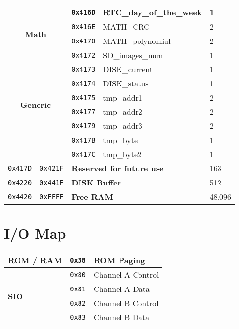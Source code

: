 \documentclass[a4paper,11pt]{article}
\begin{document}
\begin{longtable}{ |l|l|l|l|l| }
        \multicolumn{2}{|c|}{} & \texttt{0x416D} & RTC\_day\_of\_the\_week & 1\\
        \hline
        \multicolumn{2}{|c|}{\multirow{2}{*}{\textbf{Math}}} & \texttt{0x416E} & MATH\_CRC & 2\\
        \multicolumn{2}{|c|}{} & \texttt{0x4170} & MATH\_polynomial & 2\\
        \hline
        \multicolumn{2}{|c|}{\multirow{8}{*}{\textbf{Generic}}} & \texttt{0x4172} & SD\_images\_num & 1\\
        \multicolumn{2}{|c|}{} & \texttt{0x4173} & DISK\_current & 1\\
        \multicolumn{2}{|c|}{} & \texttt{0x4174} & DISK\_status & 1\\
        \multicolumn{2}{|c|}{} & \texttt{0x4175} & tmp\_addr1 & 2\\
        \multicolumn{2}{|c|}{} & \texttt{0x4177} & tmp\_addr2 & 2\\
        \multicolumn{2}{|c|}{} & \texttt{0x4179} & tmp\_addr3 & 2\\
        \multicolumn{2}{|c|}{} & \texttt{0x417B} & tmp\_byte & 1\\
        \multicolumn{2}{|c|}{} & \texttt{0x417C} & tmp\_byte2 & 1\\
        \hline
        \texttt{0x417D} & \texttt{0x421F} & \multicolumn{2}{|l|}{\textbf{Reserved for future use}} & 163\\
        \hline
        \texttt{0x4220} & \texttt{0x441F} & \multicolumn{2}{|l|}{\textbf{DISK Buffer}} & 512\\
        \hline
        \texttt{0x4420} & \texttt{0xFFFF} & \multicolumn{2}{|l|}{\textbf{Free RAM}} & 48,096\\
        \hline
      \end{longtable}

    \pagebreak
    \section{I/O Map}

    \begin{tabular}{l l l }
        \hline
        \textbf{ROM / RAM} & \texttt{0x38} & ROM Paging\\
        \hline
        \multirow{4}{*}{\textbf{SIO}} & \texttt{0x80} & Channel A Control\\
        & \texttt{0x81} & Channel A Data\\
        & \texttt{0x82} & Channel B Control\\
        & \texttt{0x83} & Channel B Data\\
        \hline
    \end{tabular}
\end{document}

